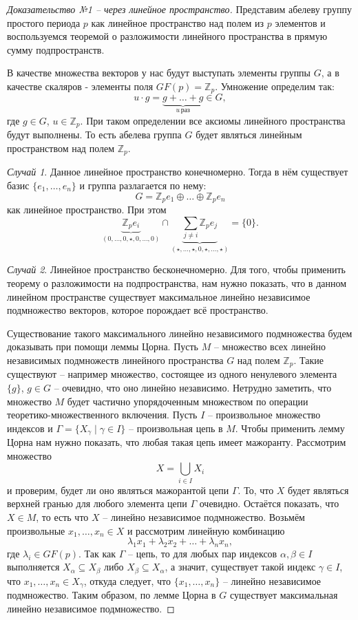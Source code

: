 \documentclass{article}
\begin{document}
\begin{proof}[Доказательство №1 -- через линейное пространство]
    Представим абелеву группу простого периода $p$ как линейное пространство над полем из $p$ элементов и воспользуемся теоремой о разложимости линейного пространства в прямую сумму подпространств.

    В качестве множества векторов у нас будут выступать элементы группы $G$, а в качестве скаляров - элементы поля $GF(p) = \mathbb{Z}_p$. Умножение определим так: $$ u \cdot g = \underbrace{g + \dots + g}_{u \, \text{раз}} \in G, $$ где $g \in G$, $u \in \mathbb{Z}_p$. При таком определении все аксиомы линейного пространства будут выполнены. То есть абелева группа $G$ будет являться линейным пространством над полем $\mathbb{Z}_p$.
    
    \textit{Случай 1}. Данное линейное пространство конечномерно. Тогда в нём существует базис $\{ e_1, \dots, e_n \}$ и группа разлагается по нему: $$ G = \mathbb{Z}_p e_1 \oplus \ldots \oplus \mathbb{Z}_p e_n $$ как линейное пространство. При этом $$ \underbrace{\mathbb{Z}_p e_i}_{(0, \dots, 0, \star, 0, \dots, 0 )} \cap \underbrace{\sum_{j \neq i} \mathbb{Z}_p e_j}_{(\star, \dots, \star, 0, \star, \dots, \star )} = \{ 0 \}. $$

    \textit{Случай 2}. Линейное пространство бесконечномерно. Для того, чтобы применить теорему о разложимости на подпространства, нам нужно показать, что в данном линейном пространстве существует максимальное линейно независимое подмножество векторов, которое порождает всё пространство.

    Существование такого максимального линейно независимого подмножества будем доказывать при помощи леммы Цорна. Пусть $M$ -- множество всех линейно независимых подмножеств линейного пространства $G$ над полем $\mathbb{Z}_p$. Такие существуют -- например множество, состоящее из одного ненулевого элемента $\{ g \}$, $g \in G$ -- очевидно, что оно линейно независимо. Нетрудно заметить, что множество $M$ будет частично упорядоченным множеством по операции теоретико-множественного включения. Пусть $I$ -- произвольное множество индексов и $\Gamma = \{ X_\gamma \mid \gamma \in I \}$ -- произвольная цепь в $M$. Чтобы применить лемму Цорна нам нужно показать, что любая такая цепь имеет мажоранту. Рассмотрим множество $$ X = \bigcup_{i \in I} X_i $$ и проверим, будет ли оно являться мажорантой цепи $\Gamma$. То, что $X$ будет являться верхней гранью для любого элемента цепи $\Gamma$ очевидно. Остаётся показать, что $X \in M$, то есть что $X$ -- линейно независимое подмножество. Возьмём произвольные $ x_1, \dots, x_n \in X$ и рассмотрим линейную комбинацию $$ \lambda_1 x_1 + \lambda_2 x_2 + \ldots + \lambda_n x_n, $$ где $\lambda_i \in GF(p)$. Так как $\Gamma$ -- цепь, то для любых пар индексов $\alpha, \beta \in I$ выполняется $X_\alpha \subseteq X_\beta$ либо $X_\beta \subseteq X_\alpha$, а значит, существует такой индекс $\gamma \in I$, что $ x_1, \dots, x_n \in X_\gamma$, откуда следует, что $ \{ x_1, \dots , x_n \} $ -- линейно независимое подмножество. Таким образом, по лемме Цорна в $G$ существует максимальная линейно независимое подмножество.


\end{proof}
\end{document}

